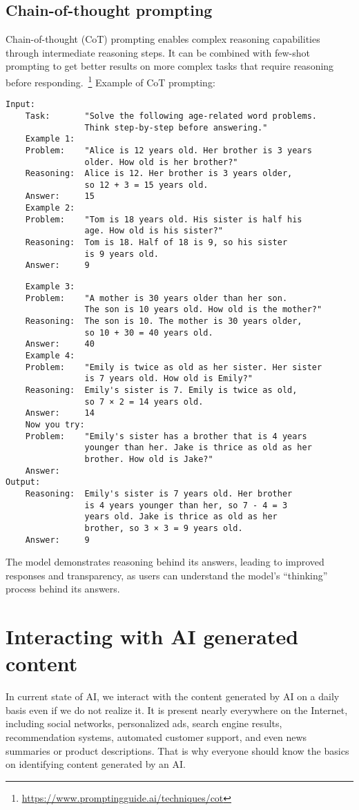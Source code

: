 \subsection*{Chain-of-thought prompting}
Chain-of-thought (CoT) prompting enables complex reasoning capabilities through intermediate reasoning steps. It can be combined with few-shot prompting to get better results on more complex tasks that require reasoning before responding.~\footnote{\url{https://www.promptingguide.ai/techniques/cot}} Example of CoT prompting:
\begin{verbatim}
Input:
    Task:       "Solve the following age-related word problems.
                Think step-by-step before answering."
    Example 1:
    Problem:    "Alice is 12 years old. Her brother is 3 years
                older. How old is her brother?"
    Reasoning:  Alice is 12. Her brother is 3 years older, 
                so 12 + 3 = 15 years old.
    Answer:     15
    Example 2:
    Problem:    "Tom is 18 years old. His sister is half his
                age. How old is his sister?"
    Reasoning:  Tom is 18. Half of 18 is 9, so his sister 
                is 9 years old.
    Answer:     9
\end{verbatim}
\clearpage
\begin{verbatim}
    Example 3:
    Problem:    "A mother is 30 years older than her son. 
                The son is 10 years old. How old is the mother?"
    Reasoning:  The son is 10. The mother is 30 years older, 
                so 10 + 30 = 40 years old.
    Answer:     40
    Example 4:
    Problem:    "Emily is twice as old as her sister. Her sister
                is 7 years old. How old is Emily?"
    Reasoning:  Emily's sister is 7. Emily is twice as old, 
                so 7 × 2 = 14 years old.
    Answer:     14
    Now you try:
    Problem:    "Emily's sister has a brother that is 4 years 
                younger than her. Jake is thrice as old as her 
                brother. How old is Jake?"
    Answer: 
Output:
    Reasoning:  Emily's sister is 7 years old. Her brother 
                is 4 years younger than her, so 7 - 4 = 3 
                years old. Jake is thrice as old as her 
                brother, so 3 × 3 = 9 years old. 
    Answer:     9
\end{verbatim}

The model demonstrates reasoning behind its answers, leading to improved responses and transparency, as users can understand the model's ``thinking'' process behind its answers.

\section{Interacting with AI generated content}
In current state of AI, we interact with the content generated by AI on a daily basis even if we do not realize it. It is present nearly everywhere on the Internet, including social networks, personalized ads, search engine results, recommendation systems, automated customer support, and even news summaries or product descriptions. That is why everyone should know the basics on identifying content generated by an AI.

